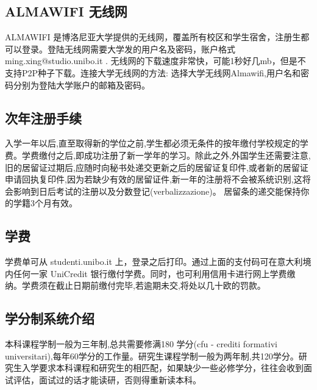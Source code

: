 \subsection{ALMAWIFI 无线网}
ALMAWIFI 是博洛尼亚大学提供的无线网，覆盖所有校区和学生宿舍，注册生都可以登录。登陆无线网需要大学发的用户名及密码，账户格式 ming.xing@studio.unibo.it . 无线网的下载速度非常快，可能1秒好几mb，但是不支持P2P种子下载。连接大学无线网的方法: 选择大学无线网Almawifi,用户名和密码分别为登陆大学账户的邮箱及密码。

\subsection{次年注册手续}
入学一年以后,直至取得新的学位之前,学生都必须无条件的按年缴付学校规定的学费。学费缴付之后,即成功注册了新一学年的学习。除此之外,外国学生还需要注意,旧的居留证过期后,应随时向秘书处递交更新之后的居留证复印件,或者新的居留证申请回执复印件,因为若缺少有效的居留证件,新一年的注册将不会被系统识别,这将会影响到日后考试的注册以及分数登记(verbalizzazione)。 居留条的递交能保持你的学籍3个月有效。

\subsection{学费}
学费单可从 studenti.unibo.it 上，登录之后打印。通过上面的支付码可在意大利境内任何一家 UniCredit 银行缴付学费。同时，也可利用信用卡进行网上学费缴纳。学费须在截止日期前缴付完毕,若逾期未交,将处以几十欧的罚款。 

\subsection{学分制系统介绍}
本科课程学制一般为三年制,总共需要修满180 学分(cfu - crediti formativi universitari),每年60学分的工作量。研究生课程学制一般为两年制,共120学分。研究生入学要求本科课程和研究生的相匹配，如果缺少一些必修学分，往往会收到面试评估，面试过的话才能读研，否则得重新读本科。 

